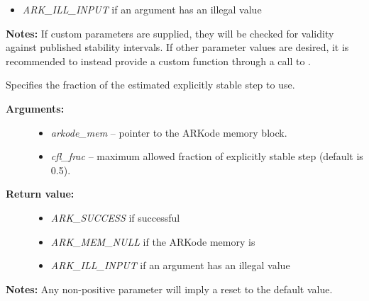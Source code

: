\documentclass[letterpaper,10pt,english]{sphinxmanual}
\begin{document}
\begin{fulllineitems}
\begin{description}
\begin{itemize}
\item {} 
\emph{ARK\_ILL\_INPUT} if an argument has an illegal value

\end{itemize}

\end{description}

\textbf{Notes:} If custom parameters are supplied, they will be checked
for validity against published stability intervals.  If other
parameter values are desired, it is recommended to instead provide
a custom function through a call to {\hyperref[c_interface/User_callable:ARKodeSetAdaptivityFn]{}}.

\end{fulllineitems}


\begin{fulllineitems}
\label{c_interface/User_callable:ARKodeSetCFLFraction}
Specifies the fraction of the estimated explicitly stable step to use.
\begin{description}
\item[{\textbf{Arguments:}}] \leavevmode\begin{itemize}
\item {} 
\emph{arkode\_mem} -- pointer to the ARKode memory block.

\item {} 
\emph{cfl\_frac} -- maximum allowed fraction of explicitly stable step (default is 0.5).

\end{itemize}

\item[{\textbf{Return value:}}] \leavevmode\begin{itemize}
\item {} 
\emph{ARK\_SUCCESS} if successful

\item {} 
\emph{ARK\_MEM\_NULL} if the ARKode memory is 

\item {} 
\emph{ARK\_ILL\_INPUT} if an argument has an illegal value

\end{itemize}

\end{description}

\textbf{Notes:} Any non-positive parameter will imply a reset to the default
value.

\end{fulllineitems}
\end{document}
